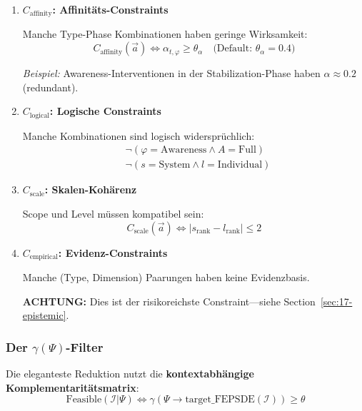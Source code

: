 \begin{enumerate}
\item \textbf{$C_{\text{affinity}}$: Affinitäts-Constraints}

Manche Type-Phase Kombinationen haben geringe Wirksamkeit:
\begin{equation}
C_{\text{affinity}}(\vec{a}) \iff \alpha_{t,\varphi} \geq \theta_\alpha \quad \text{(Default: } \theta_\alpha = 0.4\text{)}
\end{equation}

\textit{Beispiel:} Awareness-Interventionen in der Stabilization-Phase haben $\alpha \approx 0.2$ (redundant).

\item \textbf{$C_{\text{logical}}$: Logische Constraints}

Manche Kombinationen sind logisch widersprüchlich:
\begin{align}
&\neg(\varphi = \text{Awareness} \wedge A = \text{Full}) \tag{Redundanz} \\
&\neg(s = \text{System} \wedge l = \text{Individual}) \tag{Skalen-Mismatch}
\end{align}

\item \textbf{$C_{\text{scale}}$: Skalen-Kohärenz}

Scope und Level müssen kompatibel sein:
\begin{equation}
C_{\text{scale}}(\vec{a}) \iff |s_{\text{rank}} - l_{\text{rank}}| \leq 2
\end{equation}

\item \textbf{$C_{\text{empirical}}$: Evidenz-Constraints}

Manche (Type, Dimension) Paarungen haben keine Evidenzbasis.

\textbf{ACHTUNG:} Dies ist der risikoreichste Constraint---siehe Section~\ref{sec:17-epistemic}.
\end{enumerate}

\subsubsection{Der $\gamma(\Psi)$-Filter}

Die eleganteste Reduktion nutzt die \textbf{kontextabhängige Komplementaritätsmatrix}:
\begin{equation}
\boxed{\text{Feasible}(\mathcal{I} | \Psi) \iff \gamma(\Psi \rightarrow \text{target\_FEPSDE}(\mathcal{I})) \geq \theta}
\label{eq:17-gamma-filter}
\end{equation}

